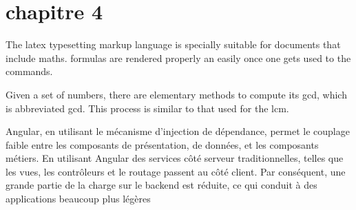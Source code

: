 \chapter{chapitre 4}
\begin{onehalfspace}


The \Gls{latex} typesetting markup language is specially suitable 
for documents that include \gls{maths}. \Glspl{formula} are 
rendered properly an easily once one gets used to the commands.
 
Given a set of numbers, there are elementary methods to compute 
its \acrlong{gcd}, which is abbreviated \acrshort{gcd}. This 
process is similar to that used for the \acrfull{lcm}.

Angular, en utilisant le mécanisme d'injection de dépendance, permet le couplage faible entre les composants de présentation, de données, et les composants métiers. En utilisant Angular des services côté serveur traditionnelles, telles que les vues, les contrôleurs et le routage passent au côté client. Par conséquent, une grande partie de la charge sur le backend est réduite, ce qui conduit à des applications beaucoup plus légères


\end{onehalfspace}
